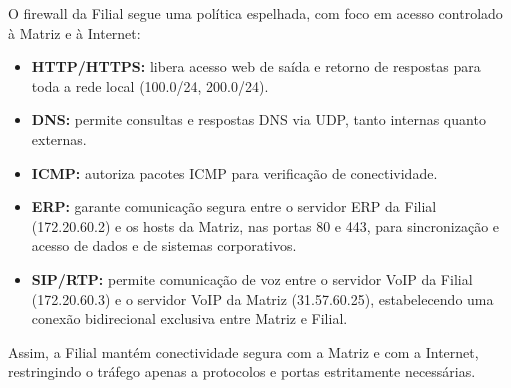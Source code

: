 \documentclass[a4paper, 12pt]{article}
\begin{document}
O firewall da Filial segue uma política espelhada, com foco em acesso controlado à Matriz e à Internet:

\begin{itemize}
    \item \textbf{HTTP/HTTPS:} libera acesso web de saída e retorno de respostas para toda a rede local (100.0/24, 200.0/24).
    \item \textbf{DNS:} permite consultas e respostas DNS via UDP, tanto internas quanto externas.
    \item \textbf{ICMP:} autoriza pacotes ICMP para verificação de conectividade.
    \item \textbf{ERP:} garante comunicação segura entre o servidor ERP da Filial (172.20.60.2) e os hosts da Matriz, nas portas 80 e 443, para sincronização e acesso de dados e de sistemas corporativos.
    \item \textbf{SIP/RTP:} permite comunicação de voz entre o servidor VoIP da Filial (172.20.60.3) e o servidor VoIP da Matriz (31.57.60.25), estabelecendo uma conexão bidirecional exclusiva entre Matriz e Filial.
\end{itemize}

Assim, a Filial mantém conectividade segura com a Matriz e com a Internet, restringindo o tráfego apenas a protocolos e portas estritamente necessárias.

\begin{table}[H]
\centering
\scriptsize
\caption{Regras de Firewall - FILIAL}
\label{tab:firewall_filial}
\end{table}
\end{document}
